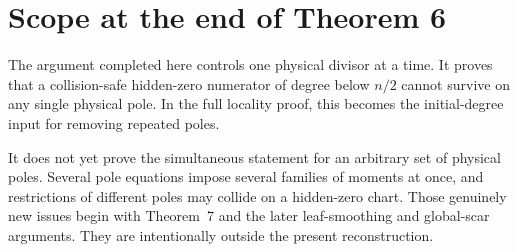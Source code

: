 \documentclass[11pt]{article}
\theoremstyle{definition}
\begin{document}
\section*{Scope at the end of Theorem 6}

The argument completed here controls one physical divisor at a time.  It proves that a collision-safe hidden-zero numerator of degree below $n/2$ cannot survive on any single physical pole.  In the full locality proof, this becomes the initial-degree input for removing repeated poles.

It does not yet prove the simultaneous statement for an arbitrary set of physical poles.  Several pole equations impose several families of moments at once, and restrictions of different poles may collide on a hidden-zero chart.  Those genuinely new issues begin with Theorem~7 and the later leaf-smoothing and global-scar arguments.  They are intentionally outside the present reconstruction.
\end{document}
